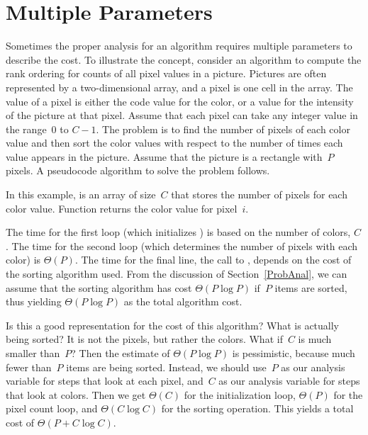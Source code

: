 \section{Multiple Parameters}

Sometimes the proper analysis for an algorithm requires
multiple parameters to describe the cost.
To illustrate the concept, consider an algorithm to compute
the rank ordering for counts of all pixel values in a picture.
Pictures are often represented by a two-dimensional array, and a
pixel is one cell in the array.
The value of a pixel is either the code value for the color, or a
value for the intensity of the picture at that pixel.
Assume that each pixel can take any integer value in the range~0
to \(C - 1\).
The problem is to find the number of pixels of each color
value and then sort the color values with respect to the number
of times each value appears in the picture.
Assume that the picture is a rectangle with~\(P\) pixels.
A pseudocode algorithm to solve the problem follows.


\noindent In this example,  is an array of size~\(C\) that
stores the number of pixels for each color value.
Function  returns the color value for pixel~\(i\).

The time for the first  loop (which initializes
) is based on the number of colors, \(C\).
The time for the second loop (which determines the number of pixels
with each color) is \(\Theta(P)\).
The time for the final line, the call to , depends on the
cost of the sorting algorithm used.
From the discussion of Section~\ref{ProbAnal}, we can assume that the
sorting algorithm has cost \(\Theta(P \log P)\) if~\(P\) items are
sorted, thus yielding \(\Theta(P \log P)\) as the total algorithm cost.

Is this a good representation for the cost of this algorithm?
What is actually being sorted?
It is not the pixels, but rather the colors.
What if~\(C\) is much smaller than~\(P\)?
Then the estimate of \(\Theta(P \log P)\) is pessimistic, because much 
fewer than~\(P\) items are being sorted.
Instead, we should use~\(P\) as our analysis variable for steps that
look at each pixel, and~\(C\) as our analysis variable for steps that
look at colors.
Then we get \(\Theta(C)\) for the initialization loop,
\(\Theta(P)\) for the pixel count loop,
and \(\Theta(C \log C)\) for the sorting operation.
This yields a total cost of \(\Theta(P + C \log C)\).

